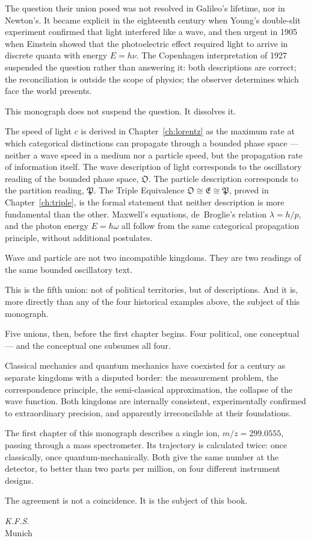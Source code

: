 The question their union posed was not resolved in Galileo's lifetime,
nor in Newton's.
It became explicit in the eighteenth century when Young's double-slit
experiment confirmed that light interfered like a wave, and then urgent
in 1905 when Einstein showed that the photoelectric effect required light
to arrive in discrete quanta with energy $E = h\nu$.
The Copenhagen interpretation of 1927 suspended the question rather than
answering it: both descriptions are correct; the reconciliation is
outside the scope of physics; the observer determines which face
the world presents.

This monograph does not suspend the question.
It dissolves it.

The speed of light $c$ is derived in Chapter~\ref{ch:lorentz} as the
maximum rate at which categorical distinctions can propagate through
a bounded phase space --- neither a wave speed in a medium nor a particle
speed, but the propagation rate of information itself.
The wave description of light corresponds to the oscillatory reading of
the bounded phase space, $\mathfrak{O}$.
The particle description corresponds to the partition reading,
$\mathfrak{P}$.
The Triple Equivalence $\mathfrak{O} \cong \mathfrak{E} \cong \mathfrak{P}$,
proved in Chapter~\ref{ch:triple}, is the formal statement that neither
description is more fundamental than the other.
Maxwell's equations, de~Broglie's relation $\lambda = h/p$, and the
photon energy $E = \hbar\omega$ all follow from the same categorical
propagation principle, without additional postulates.

Wave and particle are not two incompatible kingdoms.
They are two readings of the same bounded oscillatory text.

This is the fifth union: not of political territories, but of
descriptions.
And it is, more directly than any of the four historical examples above,
the subject of this monograph.

\bigskip\bigskip
\noindent
Five unions, then, before the first chapter begins.
Four political, one conceptual --- and the conceptual one subsumes all
four.

Classical mechanics and quantum mechanics have coexisted for a century
as separate kingdoms with a disputed border: the measurement problem,
the correspondence principle, the semi-classical approximation, the
collapse of the wave function.
Both kingdoms are internally consistent, experimentally confirmed to
extraordinary precision, and apparently irreconcilable at their
foundations.

The first chapter of this monograph describes a single ion,
$m/z = 299.0555$, passing through a mass spectrometer.
Its trajectory is calculated twice: once classically, once
quantum-mechanically.
Both give the same number at the detector, to better than two parts per
million, on four different instrument designs.

The agreement is not a coincidence.
It is the subject of this book.

\vfill
\begin{flushright}
\textit{K.F.S.}\\
Munich
\end{flushright}
